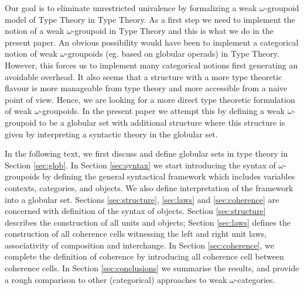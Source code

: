 Our goal is to eliminate unrestricted univalence by formalizing a weak
$\omega$-groupoid model of Type Theory in Type Theory.  As a first
step we need to implement the notion of a weak $\omega$-groupoid in
Type Theory and this is what we do in the present paper.  An obvious
possibility would have been to implement a categorical notion of weak
$\omega$-groupoids (eg. based on globular operads) in Type
Theory. However, this forces us to implement many categorical notions
first generating an avoidable overhead. It also seems that a structure
with a more type theoretic flavour is more manageable from type theory
and more accessible from a naive point of view. Hence, we are looking
for a more direct type theoretic formulation of weak
$\omega$-groupoids. In the present paper we attempt this by defining a
weak $\omega$-groupoid to be a globular set with additional structure
where this structure is given by interpreting a syntactic theory in
the globular set.

In the following text, we first discuss and define globular sets in
type theory in Section \ref{sec:glob}. In Section \ref{sec:syntax} we
start introducing the syntax of $\omega$-groupoids by defining the general
syntactical framework which includes variables contexts, categories,
and objects. We also define interpretation of the framework into a
globular set. Sections \ref{sec:structure}, \ref{sec:laws} and
\ref{sec:coherence} are concerned with definition of the syntax of
objects. Section \ref{sec:structure} describes the construction of all
units and objects; Section \ref{sec:laws} defines the construction of
all coherence cells witnessing the left and right unit laws,
associativity of composition and interchange. In Section
\ref{sec:coherence}, we complete the definition of coherence by
introducing all coherence cell between coherence cells. In Section
\ref{sec:conclusions}  we summarise the results, and provide a rough
comparison to other (categorical) approaches to weak
$\omega$-categories. 



